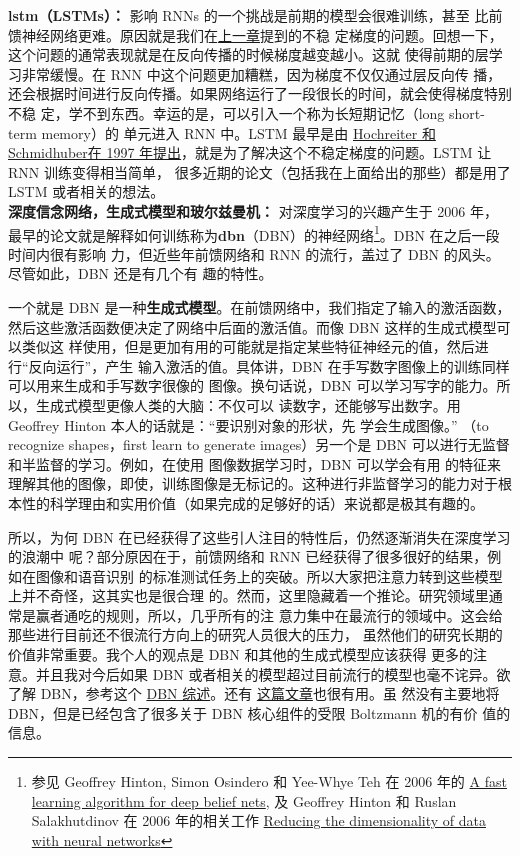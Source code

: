 \textbf{\gls{lstm}（LSTMs）：} 影响 RNNs 的一个挑战是前期的模型会很难训练，甚至
比前馈神经网络更难。原因就是我们在\hyperref[ch:WhyHardToTrain]{上一章}提到的不稳
定梯度的问题。回想一下，这个问题的通常表现就是在反向传播的时候梯度越变越小。这就
使得前期的层学习非常缓慢。在 RNN 中这个问题更加糟糕，因为梯度不仅仅通过层反向传
播，还会根据时间进行反向传播。如果网络运行了一段很长的时间，就会使得梯度特别不稳
定，学不到东西。幸运的是，可以引入一个称为长短期记忆（long short-term memory）的
单元进入 RNN 中。LSTM 最早是由
\href{http://dx.doi.org/10.1162/neco.1997.9.8.1735}{Hochreiter 和 Schmidhuber在
  1997 年提出}，就是为了解决这个不稳定梯度的问题。LSTM 让 RNN 训练变得相当简单，
很多近期的论文（包括我在上面给出的那些）都是用了 LSTM 或者相关的想法。\\

\textbf{深度信念网络，生成式模型和玻尔兹曼机：} 对深度学习的兴趣产生于 2006 年，
最早的论文就是解释如何训练称为\textbf{\gls{dbn}}（DBN）的神经网络\footnote{参见
  Geoffrey Hinton, Simon Osindero 和 Yee-Whye Teh 在 2006 年的
  \href{http://www.cs.toronto.edu/~hinton/absps/fastnc.pdf}{A fast learning
    algorithm for deep belief nets}, 及 Geoffrey Hinton 和 Ruslan Salakhutdinov
  在 2006 年的相关工作
  \href{http://www.sciencemag.org/content/313/5786/504.short}{Reducing the
    dimensionality of data with neural networks}}。DBN 在之后一段时间内很有影响
力，但近些年前馈网络和 RNN 的流行，盖过了 DBN 的风头。尽管如此，DBN 还是有几个有
趣的特性。

一个就是 DBN 是一种\textbf{生成式模型}。在前馈网络中，我们指定了输入的激活函数，
然后这些激活函数便决定了网络中后面的激活值。而像 DBN 这样的生成式模型可以类似这
样使用，但是更加有用的可能就是指定某些特征神经元的值，然后进行“反向运行”，产生
输入激活的值。具体讲，DBN 在手写数字图像上的训练同样可以用来生成和手写数字很像的
图像。换句话说，DBN 可以学习写字的能力。所以，生成式模型更像人类的大脑：不仅可以
读数字，还能够写出数字。用 Geoffrey Hinton 本人的话就是：“要识别对象的形状，先
学会生成图像。” （to recognize shapes，first learn to generate images）另一个是
DBN 可以进行无监督和半监督的学习。例如，在使用 图像数据学习时，DBN 可以学会有用
的特征来理解其他的图像，即使，训练图像是无标记的。这种进行非监督学习的能力对于根
本性的科学理由和实用价值（如果完成的足够好的话）来说都是极其有趣的。

所以，为何 DBN 在已经获得了这些引人注目的特性后，仍然逐渐消失在深度学习的浪潮中
呢？部分原因在于，前馈网络和 RNN 已经获得了很多很好的结果，例如在图像和语音识别
的标准测试任务上的突破。所以大家把注意力转到这些模型上并不奇怪，这其实也是很合理
的。然而，这里隐藏着一个推论。研究领域里通常是赢者通吃的规则，所以，几乎所有的注
意力集中在最流行的领域中。这会给那些进行目前还不很流行方向上的研究人员很大的压力，
虽然他们的研究长期的价值非常重要。我个人的观点是 DBN 和其他的生成式模型应该获得
更多的注意。并且我对今后如果 DBN 或者相关的模型超过目前流行的模型也毫不诧异。欲
了解 DBN，参考这个
\href{http://www.scholarpedia.org/article/Deep_belief_networks}{DBN 综述}。还有
\href{http://www.cs.toronto.edu/~hinton/absps/guideTR.pdf}{这篇文章}也很有用。虽
然没有主要地将 DBN，但是已经包含了很多关于 DBN 核心组件的受限 Boltzmann 机的有价
值的信息。\\

